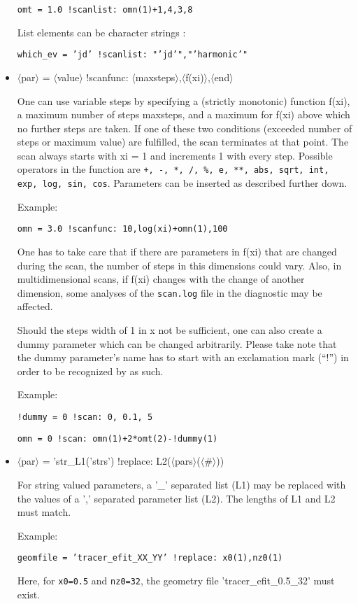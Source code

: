 \documentclass[12pt]{article}
\begin{document}
\begin{itemize}
\texttt{omt = 1.0 !scanlist: omn(1)+1,4,3,8}

List elements can be character strings :

\texttt{which\_ev  = 'jd' !scanlist: "'jd'","'harmonic'"}

\item $\langle$par$\rangle$ = $\langle$value$\rangle$ !scanfunc:
$\langle $maxsteps$\rangle$,$\langle$f(xi)$\rangle$,$\langle$end$\rangle$

One can use variable steps by
specifying a (strictly monotonic) function f(xi), a maximum number of steps
maxsteps, and a maximum for f(xi) above which no further steps are taken. If one of these two
conditions (exceeded number of steps or maximum value) are fulfilled, the scan
terminates at that point. The scan always starts with xi = 1 and increments 1
with every step. Possible
operators in the function are \texttt{+, -, *, /, \%, e, **, abs, sqrt, int, exp, log,
sin, cos}. Parameters can be inserted as described further down.

Example:

\texttt{omn = 3.0 !scanfunc: 10,log(xi)+omn(1),100}

One has to take care that if there are parameters in f(xi) that are changed
during the scan, the number of steps in this dimensions could vary. Also, in multidimensional
scans, if f(xi) changes with the change of another dimension, some analyses of the
\texttt{scan.log} file in the diagnostic may be affected.

Should the steps width of 1 in x not be sufficient, one can also create a dummy parameter
which can be changed arbitrarily. Please take note that the
dummy parameter's name has to start with an exclamation mark (``!'') in order to be recognized
by \gene as such.

Example:

\texttt{!dummy = 0 !scan: 0, 0.1, 5}

\texttt{omn = 0 !scan: omn(1)+2*omt(2)-!dummy(1)}

\item $\langle$par$\rangle$ = 'str\_L1('strs') !replace:
L2($\langle$pars$\rangle$($\langle$\#$\rangle$))

For string valued parameters, a '\_' separated list (L1) may be replaced with the values of a
',' separated parameter list (L2).
The lengths of L1 and L2 must match.

Example:

\texttt{geomfile = 'tracer\_efit\_XX\_YY' !replace: x0(1),nz0(1)}

Here, for \texttt{x0=0.5} and \texttt{nz0=32}, the geometry file 'tracer\_efit\_0.5\_32' must exist.

\end{itemize}
\end{document}
